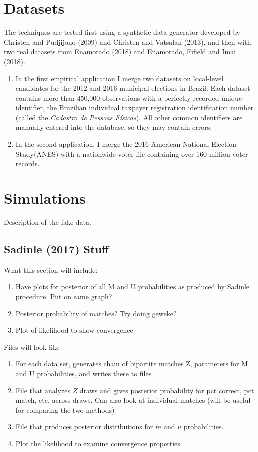 \documentclass[11pt,reqno]{amsart}
\begin{document}
\section{Datasets}
The techniques are tested first using a synthetic data generator developed by Christen and Pudjijono (2009) and Christen and Vatsalan (2013), and then with two real datasets from Enamorado (2018) and Enamorado, Fifield and Imai (2018). 
\begin{enumerate}
\item In the first empirical application I merge two datasets on local-level candidates for the 2012 and 2016 municipal elections in Brazil.  Each dataset contains more than 450,000 observations with a perfectly-recorded unique identifier, the Brazilian individual taxpayer registration identification number (called the \textit{Cadastro de Pessoas F\'isicas}).  All other common identifiers are manually entered into the database, so they may contain errors.  

\item In the second application, I merge the 2016 American National Election Study(ANES) with a nationwide voter file containing over 160 million voter records.  
\end{enumerate}


\section{Simulations}
Description of the fake data.  
\subsection{Sadinle (2017) Stuff}
What this section will include:
\begin{enumerate}
\item Have plots for posterior of all M and U probabilities as produced by Sadinle procedure.  Put on same graph? 
\item Posterior probability of matches? Try doing geweke? 
\item Plot of likelihood to show convergence
\end{enumerate}

Files will look like 
\begin{enumerate}
\item For each data set, generates chain of bipartite matches Z, parameters for M and U probabilities, and writes these to files
\item File that analyzes $Z$ draws and gives posterior probability for pct correct, pct match, etc. across draws.  Can also look at individual matches (will be useful for comparing the two methods)
\item File that produces posterior distributions for $m$ and $u$ probabilities. 
\item Plot the likelihood to examine convergence properties.  
\end{enumerate}
\end{document}
